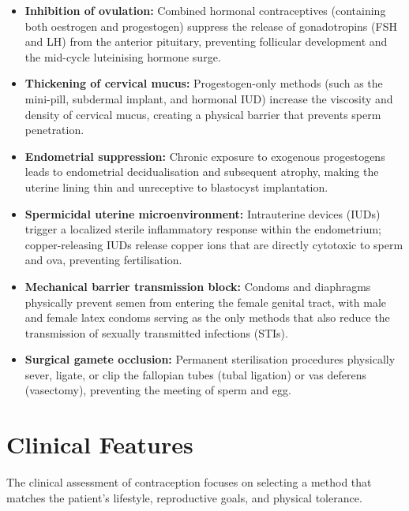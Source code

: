 \begin{itemize}
    \item \textbf{Inhibition of ovulation:} Combined hormonal contraceptives (containing both oestrogen and progestogen) suppress the release of gonadotropins (FSH and LH) from the anterior pituitary, preventing follicular development and the mid-cycle luteinising hormone surge.
    \item \textbf{Thickening of cervical mucus:} Progestogen-only methods (such as the mini-pill, subdermal implant, and hormonal IUD) increase the viscosity and density of cervical mucus, creating a physical barrier that prevents sperm penetration.
    \item \textbf{Endometrial suppression:} Chronic exposure to exogenous progestogens leads to endometrial decidualisation and subsequent atrophy, making the uterine lining thin and unreceptive to blastocyst implantation.
    \item \textbf{Spermicidal uterine microenvironment:} Intrauterine devices (IUDs) trigger a localized sterile inflammatory response within the endometrium; copper-releasing IUDs release copper ions that are directly cytotoxic to sperm and ova, preventing fertilisation.
    \item \textbf{Mechanical barrier transmission block:} Condoms and diaphragms physically prevent semen from entering the female genital tract, with male and female latex condoms serving as the only methods that also reduce the transmission of sexually transmitted infections (STIs).
    \item \textbf{Surgical gamete occlusion:} Permanent sterilisation procedures physically sever, ligate, or clip the fallopian tubes (tubal ligation) or vas deferens (vasectomy), preventing the meeting of sperm and egg.
\end{itemize}

\section*{Clinical Features}
The clinical assessment of contraception focuses on selecting a method that matches the patient's lifestyle, reproductive goals, and physical tolerance.

